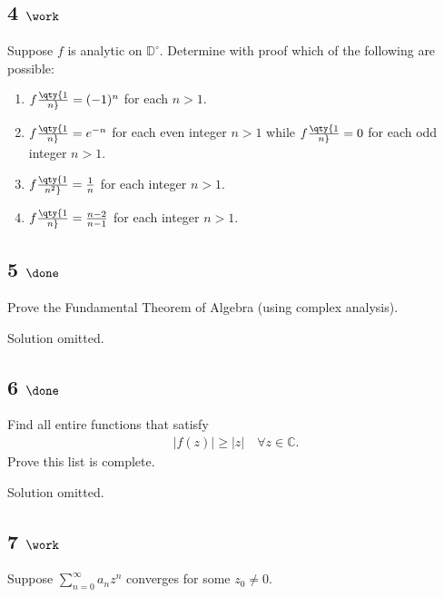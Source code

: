 \hypertarget{work-25}{%
\subsection{\texorpdfstring{4
\(\work\)}{4 \textbackslash work}}\label{work-25}}

Suppose \(f\) is analytic on \({\mathbb{D}}^\circ\). Determine with
proof which of the following are possible:

\begin{enumerate}
\def\labelenumi{\alph{enumi}.}
\item
  \(f\qty{1\over n} = (-1)^n\) for each \(n>1\).
\item
  \(f\qty{1\over n} = e^{-n}\) for each even integer \(n>1\) while
  \(f\qty{1\over n} = 0\) for each odd integer \(n>1\).
\item
  \(f\qty{1\over n^2} = {1\over n}\) for each integer \(n>1\).
\item
  \(f\qty{1\over n} = {n-2 \over n-1}\) for each integer \(n>1\).
\end{enumerate}

\hypertarget{done-4}{%
\subsection{\texorpdfstring{5
\(\done\)}{5 \textbackslash done}}\label{done-4}}

Prove the Fundamental Theorem of Algebra (using complex analysis).

Solution omitted.

\hypertarget{done-5}{%
\subsection{\texorpdfstring{6
\(\done\)}{6 \textbackslash done}}\label{done-5}}

Find all entire functions that satisfy
\begin{align*}
{\left\lvert {f(z)} \right\rvert} \geq {\left\lvert {z} \right\rvert} \quad \forall z\in {\mathbb{C}}
.\end{align*}
Prove this list is complete.

Solution omitted.

\hypertarget{work-26}{%
\subsection{\texorpdfstring{7
\(\work\)}{7 \textbackslash work}}\label{work-26}}

Suppose \(\sum_{n=0}^\infty a_n z^n\) converges for some \(z_0 \neq 0\).

